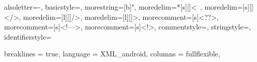 {
    alsoletter=-,
    basicstyle=\ttfamily\footnotesize,
    morestring=[b]",
    moredelim=*[s][\color{code_darkblue}]{<}{\ },
    moredelim=[s][\color{code_darkblue}]{</}{>},
    moredelim=[l][\color{code_darkblue}]{/>},
    moredelim=[l][\color{code_darkblue}]{>},
    morecomment=[s]{<?}{?>},
    morecomment=[s]{<!--}{-->},
    morecomment=[s]{<!}{>},
    commentstyle=\color{code_gray},
    stringstyle=\color{code_cyan},
    identifierstyle=\color{black}
}

{
    breaklines = true,
    language = XML_android,
    columns = fullflexible,
}

\newcommand{\androidinline}[1]{\lstinline[style = java, basicstyle = \ttfamily\normalsize]{#1}}
